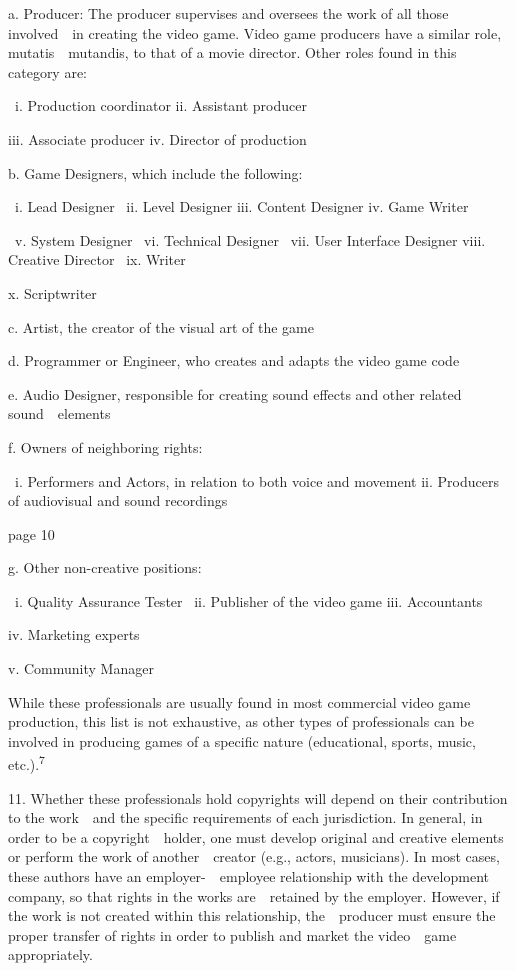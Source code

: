 \documentclass[
]{article}
\begin{document}
{a. Producer: The producer supervises and oversees the work of all those
involved~~in creating the video game. Video game producers have a
similar role, }{mutatis~~mutandis, }{to that of a movie director. Other
roles found in this category are:}

{~i. }{Production coordinator }{ii. }{Assistant producer}

{iii. }{Associate producer }{iv. }{Director of production}

{b. Game Designers, which include the following:}

{~i. }{Lead Designer }{~ii. }{Level Designer }{iii. }{Content Designer
}{iv. }{Game Writer}

{~v. }{System Designer }{~vi. }{Technical Designer }{~vii. }{User
Interface Designer }{viii. }{Creative Director }{~ix. }{Writer}

{x. }{Scriptwriter}

{c. Artist, the creator of the visual art of the game}

{d. Programmer or Engineer, who creates and adapts the video game code}

{e. Audio Designer, responsible for creating sound effects and other
related sound~~elements}

{f. Owners of neighboring rights:}

{~i. }{Performers and Actors, in relation to both voice and movement
}{ii. }{Producers of audiovisual and sound recordings}

{page 10}

{g. Other non-creative positions:}

{~i. }{Quality Assurance Tester }{~ii. }{Publisher of the video game
}{iii. }{Accountants}

{iv. }{Marketing experts}

{v. }{Community Manager}

{While these professionals are usually found in most commercial video
game production, this list is not exhaustive, as other types of
professionals can be involved in producing games of a specific nature
(educational, sports, music, etc.).}\textsuperscript{{7}}

{11. }{Whether these professionals hold copyrights will depend on their
contribution to the work~~and the specific requirements of each
jurisdiction. In general, in order to be a copyright~~holder, one must
develop original and creative elements or perform the work of
another~~creator (e.g., actors, musicians). In most cases, these authors
have an employer-~~employee relationship with the development company,
so that rights in the works are~~retained by the employer. However, if
the work is not created within this relationship, the~~producer must
ensure the proper transfer of rights in order to publish and market the
video~~game appropriately.}
\end{document}

